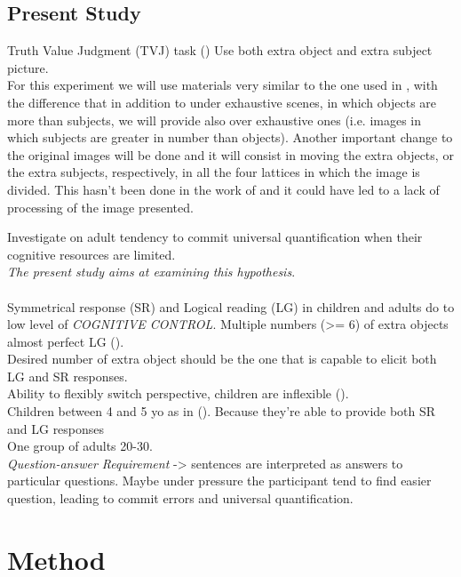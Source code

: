 \documentclass[10pt, a4]{article}
\begin{document}
\subsection{Present Study}

Truth Value Judgment (TVJ) task (\cite{crain2000investigations})
Use both extra object and extra subject picture.\\

For this experiment we will use materials very similar to the one used in \cite{minai2012hinders},
with the difference that in addition to under exhaustive scenes, in which objects are more than subjects,
we will provide also over exhaustive ones (i.e. images in which subjects are greater in number than objects).
Another important change to the original images will be done and it will consist in moving
the extra objects, or the extra subjects, respectively, in all the four lattices in which
the image is divided. This hasn't been done in the work of \cite{minai2012hinders} and it could
have led to a lack of processing of the image presented.

Investigate on adult tendency to commit universal quantification when their cognitive resources are limited.\\
\textit{The present study aims at examining this hypothesis}.\\
\\
Symmetrical response (SR) and Logical reading (LG) in children and adults do to low level of \textit{COGNITIVE CONTROL}.
Multiple numbers (>= 6) of extra objects almost perfect LG (\cite{sugisaki2001quantification}).\\
Desired number of extra object should be the one that is capable to elicit both LG and SR responses.\\
Ability to flexibly switch perspective, children are inflexible (\cite{piaget1954language}).\\
Children between 4 and 5 yo as in (\cite{minai2012hinders}). Because they're able to provide both SR and LG responses\\
One group of adults 20-30.\\
\textit{Question-answer Requirement} -> sentences are interpreted as answers to particular questions. Maybe
under pressure the participant tend to find easier question, leading to commit errors and universal quantification.\\

\section{Method}
\end{document}
